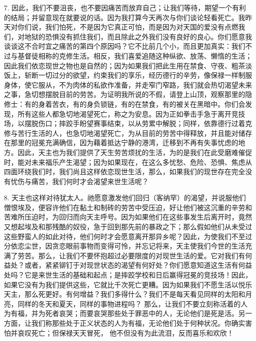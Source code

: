 7. 因此，我们不要沮丧，也不要因痛苦而放弃自己；让我们等待，期望一个有利的结局；并留意现在就要说的话。因为我打算今天再次与你们谈论轻看死亡。我昨天对你们说，我们怕死，不是因为它真正可怕，而是因为对天国的爱没有点燃我们，对地狱的恐惧没有抓住我们，而且除此之外我们没有良好的良心。你们愿意我谈谈这不合时宜之痛苦的第四个原因吗？它不比前几个小，而且更加真实：我们不过与基督徒相称的克修生活。相反，我们喜爱追随这种纵欲、放荡、懒惰的生活；因此我们依恋现世之物也是自然的；因为如果我们把此生用在禁食、守夜、粗茶淡饭上，斩断一切过分的欲望，约束我们的享乐，经历德行的辛劳，像保禄一样制服身体，使它服从，不为肉体的私欲作准备，并走窄门窄路，我们就会热切渴望未来之事，急切想摆脱目前的劳苦。为证明我所说的不假，请登上山顶，观察那里的隐修士：有的身着苦衣，有的身负锁链，有的在禁食，有的被关在黑暗中。你们会发现，所有这些人都急切地渴望死亡，称之为安息。因为正如拳击手急于离开竞技场，以摆脱伤口；摔跤手盼望赛事结束，以从劳累中解脱；同样，依靠德行过着克修与苦行生活的人，也急切地渴望死亡，为从目前的劳苦中得释放，并且能对储存在那里的冠冕充满确信，因为藉着抵达宁静的港湾，迁移到不再有失事忧虑的地方。因此，天主也为我们提供了天生劳苦烦扰的生活，为的是我们在此受磨难催促时，能对未来福乐产生渴望；因为如果现在，在这么多忧愁、危险、恐惧、焦虑从四面环绕我们时，我们尚且这样依恋现世生活，那么，如果我们的现世存在完全没有忧伤与痛苦，我们何时才会渴望来世生活呢？\par

8. 天主也这样对待犹太人。祂愿意激发他们回归（客纳罕）的渴望，并说服他们憎恨埃及，便容许他们在黏土和制砖的劳苦中受压迫，好让他们被这沉重的辛劳和苦难所压迫时，为回归而向天主呼号。因为如果他们在这些事发生后离开时，竟然又想起埃及和那残酷的奴役，急于回到那先前的暴政之下；那么假如他们从未受过这些野蛮人的如此对待，他们何时才会愿意离开那异乡呢？因此，为使我们不至过分依恋尘世，因贪恋眼前事物而变得可怜，并忘记将来，天主使我们今世的生活充满了劳苦。那么，让我们不要怀抱超过必要限度的对现世生活的爱。它对我们有何益处？或者，紧紧铆钉于对现世状态的渴望有何好处？你们愿意知道这生活有何益处吗？它是来世生活的基础和起点；是摔跤学校和日后赢得冠冕的竞技场！因此，如果它没有为我们提供这些，它就比千次死亡更糟。因为如果我们不愿生活以悦乐天主，那么死更好。有何增益？我们多得什么？我们不是每天看见同样的太阳和月亮，同样的冬天和夏天，同样的事物进程吗？  那么，让我们不要立刻称活着的人为有福，并为死者哀哭；而要哀哭那些处于罪恶中的人，无论他们是死是活。另一方面，让我们称那些处于正义状态的人为有福，无论他们处于何种状况。你确实害怕并哀叹死亡；但保禄天天冒死， 他不但没有为此流泪，反而喜乐和欢欣！\par


